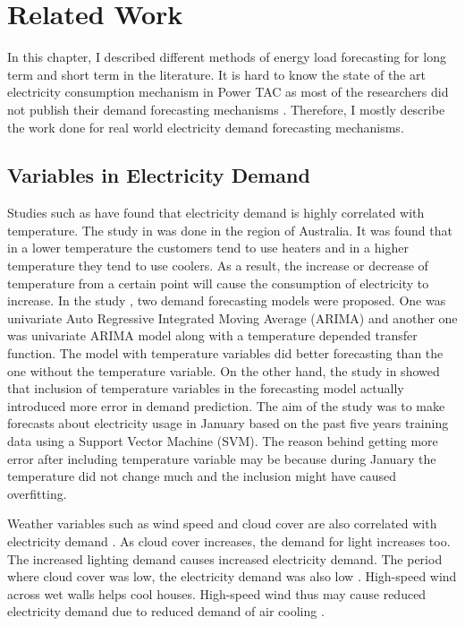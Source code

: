 
\chapter{Related Work}

In this chapter, I described different methods of energy load forecasting for long term and short term in the literature. It is hard to know the state of the art electricity consumption mechanism in Power TAC as most of the researchers did not publish their demand forecasting mechanisms \cite{liefers2014successful, ozdemir2015winner, serranofixing, ozdemir2015agentude}. Therefore, I mostly describe the work done for real world electricity demand forecasting mechanisms.   

\section{Variables in Electricity Demand}

Studies such as \cite{hor2005analyzing, hart2004weather, cho1995customer} have found that electricity demand is highly correlated with temperature. The study in \cite{hart2004weather} was done in the region of Australia.  It was found that in a lower temperature the customers tend to use heaters and in a higher temperature they tend to use coolers. As a result, the increase or decrease of temperature from a certain point will cause the consumption of electricity to increase. In the study \cite{cho1995customer}, two demand forecasting models were proposed. One was univariate Auto Regressive Integrated Moving Average (ARIMA) and another one was univariate ARIMA model along with a temperature depended transfer function. The model with temperature variables did better forecasting than the one without the temperature variable. On the other hand, the study in  \cite{chen2004load} showed that inclusion of temperature variables in the forecasting model actually introduced more error in demand prediction. The aim of the study was to make forecasts about electricity usage in January based on the past five years training data using a Support Vector Machine (SVM). The reason behind getting more error after including temperature variable may be because during January the temperature did not change much and the inclusion might have caused overfitting. 

Weather variables such as  wind speed and cloud cover are also correlated with electricity demand \cite{hor2005analyzing, rudenauer2004energy}. As cloud cover increases, the demand for light increases too. The increased lighting demand causes increased electricity demand. The period where cloud cover was low, the electricity demand was also low \cite{hor2005analyzing}. High-speed wind across wet walls helps cool houses. High-speed wind thus may cause reduced electricity demand due to reduced demand of air cooling \cite{rudenauer2004energy}. 


